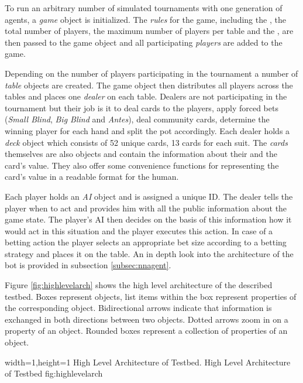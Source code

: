 To run an arbitrary number of simulated tournaments with one generation of agents, a \textit{game} object is initialized. The \textit{rules} for the game, including the , the total number of players, the maximum number of players per table and the , are then passed to the game object and all participating \textit{players} are added to the game. \par Depending on the number of players participating in the tournament a number of \textit{table} objects are created. The game object then distributes all players across the tables and places one \textit{dealer} on each table. Dealers are not participating in the tournament but their job is it to deal cards to the players, apply forced bets (\textit{Small Blind}, \textit{Big Blind} and \textit{Antes}), deal community cards, determine the winning player for each hand and split the pot accordingly. Each dealer holds a \textit{deck} object which consists of 52 unique cards, 13 cards for each suit. The \textit{cards} themselves are also objects and contain the information about their  and the card's value. They also offer some convenience functions for representing the card's value in a readable format for the human. \par
Each player holds an \textit{AI} object and is assigned a unique ID. The dealer tells the player when to act and provides him with all the public information about the game state. The player's AI then decides on the basis of this information how it would act in this situation and the player executes this action. In case of a betting action the player selects an appropriate bet size according to a betting strategy and places it on the table. An in depth look into the architecture of the bot is provided in subsection \ref{subsec:nnagent}. \par
Figure \ref{fig:highlevelarch} shows the high level architecture of the described testbed. Boxes represent objects, list items within the box represent properties of the corresponding object. Bidirectional arrows indicate that information is exchanged in both directions between two objects. Dotted arrows zoom in on a property of an object. Rounded boxes represent a collection of properties of an object.
\par
{}%
  {width=1\textwidth,height=1\textheight}%
  {High Level Architecture of Testbed.}%
  {High Level Architecture of Testbed}%
  {fig:highlevelarch}%
